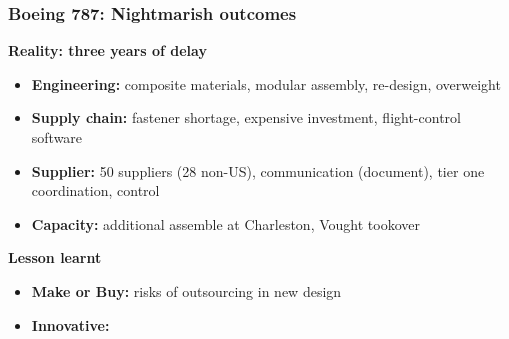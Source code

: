 \documentclass[10pt,presentation]{beamer}
\begin{document}
\begin{frame}
  \frametitle{Boeing 787: Nightmarish outcomes}

  \textbf{Reality: three years of delay}
  \begin{itemize}
    \item \textbf{Engineering:} composite materials, modular assembly, re-design, overweight
    \item \textbf{Supply chain:} fastener \alert{shortage}, expensive investment, flight-control software
    \item \textbf{Supplier:} 50 suppliers (28 non-US), communication (document), tier one coordination, control
    \item \textbf{Capacity:} additional assemble at Charleston, Vought tookover
  \end{itemize}

  \NextLine
  \textbf{Lesson learnt}
  \begin{itemize}
    \item \textbf{Make or Buy:} risks of outsourcing in new design
    \item \textbf{Innovative:}
  \end{itemize}

\end{frame}

\end{document}
